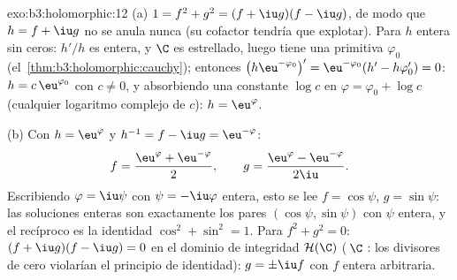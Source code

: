 \begin{solution}{exo:b3:holomorphic:12}
(a) $1 = f^2 + g^2 = (f + \iu g)(f - \iu g)$, de modo que $h = f +
\iu g$ no se anula nunca (su cofactor tendría que explotar). Para $h$
entera sin ceros: $h'/h$ es entera, y $\C$ es estrellado, luego tiene
una primitiva $\varphi_0$ (el~\cref{thm:b3:holomorphic:cauchy});
entonces $\bigl(h\eu^{-\varphi_0}\bigr)' = \eu^{-\varphi_0}(h' -
h\varphi_0') = 0$: $h = c\,\eu^{\varphi_0}$ con $c \neq 0$, y
absorbiendo una constante $\log c$ en $\varphi = \varphi_0
+ \log c$ (cualquier logaritmo complejo de $c$): $h =
\eu^{\varphi}$.

(b) Con $h = \eu^{\varphi}$ y $h^{-1} = f - \iu g =
\eu^{-\varphi}$:
\[
f = \frac{\eu^{\varphi} + \eu^{-\varphi}}2,
\qquad
g = \frac{\eu^{\varphi} - \eu^{-\varphi}}{2\iu} .
\]
Escribiendo $\varphi = \iu\psi$ con $\psi = -\iu\varphi$ entera, esto se
lee $f = \cos\psi$, $g = \sin\psi$: las soluciones enteras son
exactamente los pares $(\cos\psi,
\sin\psi)$ con $\psi$ entera, y el recíproco es la identidad
$\cos^2 + \sin^2 = 1$. Para $f^2 + g^2 = 0$:
$(f + \iu g)(f - \iu g) = 0$ en el dominio de integridad
$\mathcal H(\C)$ (\,$\C$ : los
divisores de cero violarían el principio de identidad): $g = \pm\iu
f$ con $f$ entera arbitraria.
\end{solution}


